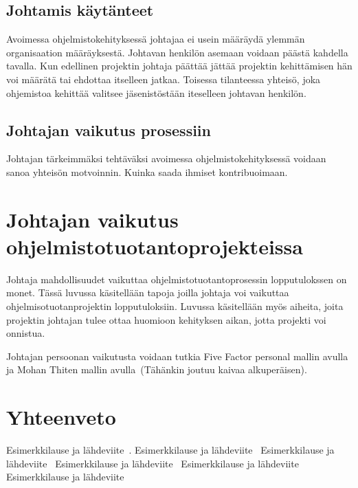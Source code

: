 \documentclass[finnish]{tktltiki2}
\theoremstyle{definition}
\theoremstyle{remark}
\begin{document}
\subsection{Johtamis käytänteet}

Avoimessa ohjelmistokehityksessä johtajaa ei usein määräydä ylemmän organisaation määräyksestä. Johtavan henkilön asemaan voidaan päästä kahdella tavalla. Kun edellinen projektin johtaja päättää jättää projektin kehittämisen hän voi määrätä tai ehdottaa itselleen jatkaa. Toisessa tilanteessa yhteisö, joka ohjemistoa kehittää valitsee jäsenistöstään iteselleen johtavan henkilön. ~\cite{Li:2006:MOS:1125170.1125182}

\subsection{Johtajan vaikutus prosessiin}

Johtajan tärkeimmäksi tehtäväksi avoimessa ohjelmistokehityksessä  voidaan sanoa yhteisön motvoinnin. Kuinka saada ihmiset kontribuoimaan.~\cite{Li:2006:MOS:1125170.1125182}


\section{Johtajan vaikutus ohjelmistotuotantoprojekteissa}

Johtaja mahdollisuudet vaikuttaa ohjelmistotuotantoprosessin lopputulokssen on monet. Tässä luvussa käsitellään tapoja joilla johtaja voi vaikuttaa ohjelmisotuotanprojektin lopputuloksiin. Luvussa käsitellään myös aiheita, joita projektin johtajan tulee ottaa huomioon kehityksen aikan, jotta projekti voi onnistua. 

Johtajan persoonan vaikutusta voidaan tutkia Five Factor personal mallin avulla ja Mohan Thiten mallin avulla~\cite{Wang:2009:PMP:1639950.1640049}(Tähänkin joutuu kaivaa alkuperäisen). 


\section{Yhteenveto}







 




Esimerkkilause ja lähdeviite~\cite{Guo:2008:SSP:1414004.1414046}.
Esimerkkilause ja lähdeviite~\cite{Zhang:2011:ECL:2047594.2047666}
Esimerkkilause ja lähdeviite~\cite{Dhomne:2012:ITL:2382887.2382899}
Esimerkkilause ja lähdeviite~\cite{bahli2005group}
Esimerkkilause ja lähdeviite~\cite{Augustine:2005:APM:1101779.1101781}
Esimerkkilause ja lähdeviite~\cite{Chow2008961}





%

%
% 
%



\end{document}
